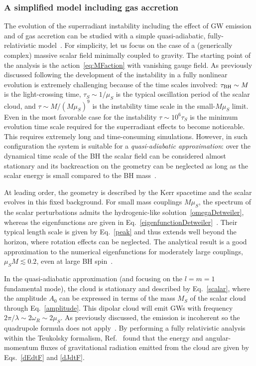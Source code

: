 \documentclass[11pt]{article}
\numberwithin{equation}{section} %
\begin{document}
\subsubsection{A simplified model including gas accretion}\label{sec:simplifiedmodel}
The evolution of the superradiant instability including the effect of GW emission and of gas accretion can be studied with a simple quasi-adiabatic, fully-relativistic model~\cite{Brito:2014wla}. For simplicity, let us focus on the case of a (generically complex) massive scalar field minimally coupled to gravity.
The starting point of the analysis is the action~\eqref{eq:MFaction} with vanishing gauge field.
%
As previously discussed following the development of the instability in a fully nonlinear evolution is extremely challenging because of the time scales involved: 
$\tau_{\rm BH}\sim M$ is the light-crossing time, $\tau_S\sim 1/\mu_S$ is the typical oscillation period of the scalar cloud, and $\tau \sim M/(M\mu_S)^9$ is the instability time scale in the small-$M\mu_S$ limit. Even in the most favorable case for the instability $\tau\sim 10^6\tau_S$ is the minimum evolution time scale required for the superradiant effects to become noticeable. 
%
This requires extremely long and time-consuming simulations.
However, in such configuration the system is suitable for a \emph{quasi-adiabatic approximation}: over the dynamical time scale of the BH the scalar field can be considered almost stationary and its backreaction on the geometry can be neglected as long as the scalar energy is small compared to the BH mass~\cite{Brito:2014wla}.  



At leading order, the geometry is described by the Kerr spacetime and the scalar evolves in this fixed background. For small mass couplings $M\mu_S$, the spectrum of the scalar perturbations admits the hydrogenic-like solution~\eqref{omegaDetweiler}, whereas the eigenfunctions are given in Eq.~\eqref{eigenfunctionDetweiler}~\cite{Detweiler:1980uk,Yoshino:2013ofa}. Their typical length scale is given by Eq.~\eqref{peak} and thus extends well beyond the horizon, where rotation effects can be neglected. 
The analytical result is a good approximation to the numerical eigenfunctions for moderately large couplings, $\mu_S M\lesssim0.2$, even at large BH spin~\cite{Brito:2014wla}. 

In the quasi-adiabatic approximation (and focusing on the $l=m=1$ fundamental mode), the cloud is stationary and described by Eq.~\eqref{scalar},
where the amplitude $A_0$ can be expressed in terms of the mass $M_S$ of the scalar cloud through Eq.~\eqref{amplitude}.
This dipolar cloud will emit GWs with frequency $ 2\pi/\lambda\sim 2\omega_R\sim 2\mu_S$. As previously discussed, the emission is incoherent so the quadrupole formula does not apply~\cite{Arvanitaki:2010sy,Yoshino:2013ofa,Brito:2014wla,Yoshino:2015nsa}. 
%
By performing a fully relativistic analysis within the Teukolsky formalism, Ref.~\cite{Brito:2014wla,Brito:2017zvb} found that the energy and angular-momentum fluxes of gravitational radiation emitted from the cloud are given by Eqs.~\eqref{dEdtF} and \eqref{dJdtF}. 
\end{document}
